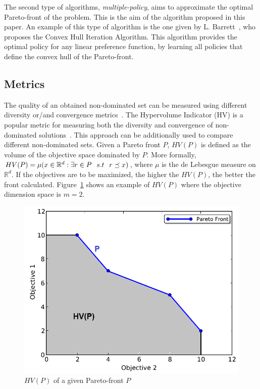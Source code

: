 \documentclass[journal]{IEEEtran}
\begin{document}
The second type of algorithms, \textit{multiple-policy}, aims to approximate the optimal Pareto-front of the problem. This is the aim of the algorithm proposed in this paper. An example of this type of algorithm is the one given by L. Barrett~\cite{Barrett2008}, who proposes the Convex Hull Iteration Algorithm. This algorithm provides the optimal policy for any linear preference function, by learning all policies that define the convex hull of the Pareto-front.



\subsection{Metrics}
The quality of an obtained non-dominated set can be measured using different diversity or/and convergence metrics~\cite{Deb2001}. The Hypervolume Indicator (HV) is a popular metric for measuring both the diversity and convergence of non-dominated solutions~\cite{Zitzler-Smetric}. This approach can be additionally used to compare different non-dominated sets. 
Given a Pareto front $P$, $HV(P)$ is defined as the volume of the objective space dominated by $P$. More formally, $HV(P) = \mu (x \in \mathbb{R}^{d} : \exists r \in P \hspace{0.25cm} s.t \hspace{0.25cm} r \preceq x)$, where $\mu$ is the de Lebesgue measure on $\mathbb{R}^{d}$. If the objectives are to be maximized, the higher the $HV(P)$, the better the front calculated. Figure~\ref{fig:hv} shows an example of $HV(P)$ where the objective dimension space is $m=2$.



\begin{figure}[!t]
\begin{center}
\includegraphics[width=0.75\columnwidth]{figures/perez3}
\end{center}
\caption{$HV(P)$ of a given Pareto-front $P$}
\label{fig:hv}
\end{figure}
\end{document}

